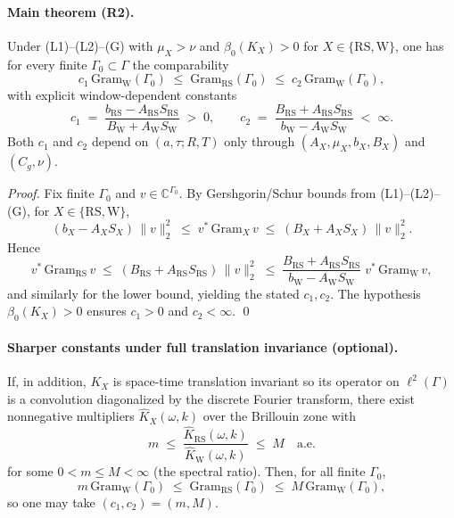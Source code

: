 \documentclass[11pt]{amsart}
\begin{document}
\paragraph{Main theorem (R2).}
Under (L1)--(L2)--(G) with $\mu_X>\nu$ and $\beta_0(K_X)>0$ for $X\in\{\mathrm{RS},\mathrm{W}\}$, one has for every finite $\Gamma_0\subset\Gamma$ the comparability
\[
  c_1\,\mathrm{Gram}_{\mathrm{W}}(\Gamma_0)\;\le\;\mathrm{Gram}_{\mathrm{RS}}(\Gamma_0)\;\le\;c_2\,\mathrm{Gram}_{\mathrm{W}}(\Gamma_0),
\]
with explicit window-dependent constants
\[
  c_1\;=\;\frac{b_{\mathrm{RS}}-A_{\mathrm{RS}} S_{\mathrm{RS}}}{B_{\mathrm{W}}+A_{\mathrm{W}} S_{\mathrm{W}}}\;>\;0,\qquad
  c_2\;=\;\frac{B_{\mathrm{RS}}+A_{\mathrm{RS}} S_{\mathrm{RS}}}{b_{\mathrm{W}}-A_{\mathrm{W}} S_{\mathrm{W}}}\;<\;\infty.
\]
Both $c_1$ and $c_2$ depend on $(a,\tau;R,T)$ only through $(A_X,\mu_X,b_X,B_X)$ and $(C_g,\nu)$.

\emph{Proof.}
Fix finite $\Gamma_0$ and $v\in\mathbb{C}^{\Gamma_0}$. By Gershgorin/Schur bounds from (L1)--(L2)--(G), for $X\in\{\mathrm{RS},\mathrm{W}\}$,
\[
  (b_X-A_X S_X)\,\|v\|_2^2\;\le\; v^*\,\mathrm{Gram}_X\,v\;\le\; (B_X+A_X S_X)\,\|v\|_2^2.
\]
Hence
\[
  v^*\,\mathrm{Gram}_{\mathrm{RS}}\,v\;\le\;(B_{\mathrm{RS}}+A_{\mathrm{RS}} S_{\mathrm{RS}})\,\|v\|_2^2\;\le\;\frac{B_{\mathrm{RS}}+A_{\mathrm{RS}} S_{\mathrm{RS}}}{b_{\mathrm{W}}-A_{\mathrm{W}} S_{\mathrm{W}}}\; v^*\,\mathrm{Gram}_{\mathrm{W}}\,v,
\]
and similarly for the lower bound, yielding the stated $c_1,c_2$. The hypothesis $\beta_0(K_X)>0$ ensures $c_1>0$ and $c_2<\infty$. \qed

\paragraph{Sharper constants under full translation invariance (optional).}
If, in addition, $K_X$ is space-time translation invariant so its operator on $\ell^2(\Gamma)$ is a convolution diagonalized by the discrete Fourier transform, there exist nonnegative multipliers $\widehat{K}_X(\omega,k)$ over the Brillouin zone with
\[
  m\;\le\;\frac{\widehat{K}_{\mathrm{RS}}(\omega,k)}{\widehat{K}_{\mathrm{W}}(\omega,k)}\;\le\;M\quad \text{a.e.}
\]
for some $0<m\le M<\infty$ (the spectral ratio). Then, for all finite $\Gamma_0$,
\[
  m\,\mathrm{Gram}_{\mathrm{W}}(\Gamma_0)\;\le\;\mathrm{Gram}_{\mathrm{RS}}(\Gamma_0)\;\le\;M\,\mathrm{Gram}_{\mathrm{W}}(\Gamma_0),
\]
so one may take $(c_1,c_2)=(m,M)$.
\end{document}
